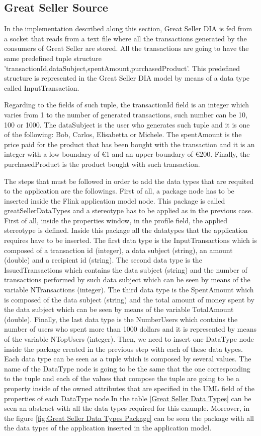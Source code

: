 \subsection{Great Seller Source}
In the implementation described along this section, Great Seller DIA is fed from a socket that reads from a text file where all the transactions generated by the consumers of Great Seller are stored. All the transactions are going to have the same predefined tuple structure 'transactionId,dataSubject,spentAmount,purchasedProduct'. This predefined structure is represented in the Great Seller DIA model by means of a data type called InputTransaction.

Regarding to the fields of such tuple, the transactionId field is an integer which varies from 1 to the number of generated transactions, such number can be 10, 100 or 1000. The dataSubject is the user who generates such tuple and it is one of the following: Bob, Carlos, Elisabetta or Michele. The spentAmount is the price paid for the product that has been bought with the transaction and it is an integer with a low boundary of \euro{1} and an upper boundary of \euro{200}. Finally, the purchasedProduct is the product bought with such transaction.

The steps that must be followed in order to add the data types that are requited to the application are the followings. First of all, a package node has to be inserted inside the Flink application model node. This package is called greatSellerDataTypes and a stereotype has to be applied as in the previous case. First of all, inside the properties window, in the profile field, the applied stereotype is defined. Inside this package all the datatypes that the application requires have to be inserted. The first data type is the InputTransactions which is composed of a transaction id (integer), a data subject (string), an amount (double) and a recipient id (string). The second data type is the IssuedTransactions which contains the data subject (string) and the number of transactions performed by such data subject which can be seen by means of the variable NTransactions (integer). The third data type is the SpentAmount which is composed of the data subject (string) and the total amount of money spent by the data subject which can be seen by means of the variable TotalAmount (double). Finally, the last data type is the NumberUsers which contains the number of users who spent more than 1000 dollars and it is represented by means of the variable NTopUsers (integer). Then, we need to insert one DataType node inside the package created in the previous step with each of these data types. Each data type can be seen as a tuple which is composed by several values. The name of the DataType node is going to be the same that the one corresponding to the tuple and each of the values that compose the tuple are going to be a property inside of the owned attributes that are specified in the UML field of the properties of each DataType node.In the table \ref{Great Seller Data Types} can be seen an abstract with all the data types required for this example. Moreover, in the figure \ref{fig:Great Seller Data Types Package} can be seen the package with all the data types of the application inserted in the application model.

